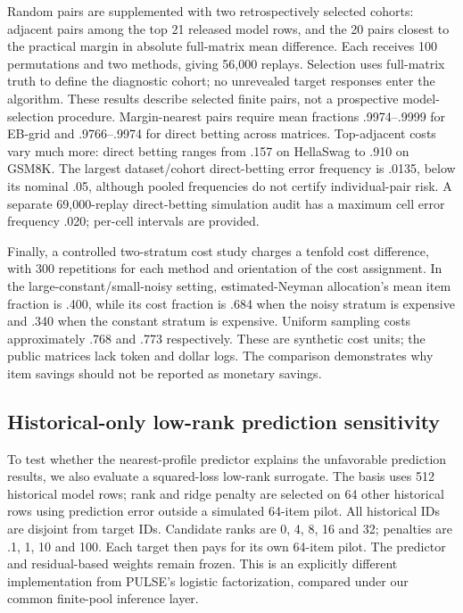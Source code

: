 Random pairs are supplemented with two retrospectively selected cohorts: adjacent pairs among the top 21 released model rows, and the 20 pairs closest to the practical margin in absolute full-matrix mean difference. Each receives 100 permutations and two methods, giving 56,000 replays. Selection uses full-matrix truth to define the diagnostic cohort; no unrevealed target responses enter the algorithm. These results describe selected finite pairs, not a prospective model-selection procedure. Margin-nearest pairs require mean fractions .9974--.9999 for EB-grid and .9766--.9974 for direct betting across matrices. Top-adjacent costs vary much more: direct betting ranges from .157 on HellaSwag to .910 on GSM8K. The largest dataset/cohort direct-betting error frequency is .0135, below its nominal .05, although pooled frequencies do not certify individual-pair risk. A separate 69,000-replay direct-betting simulation audit has a maximum cell error frequency .020; per-cell intervals are provided.

Finally, a controlled two-stratum cost study charges a tenfold cost difference, with 300 repetitions for each method and orientation of the cost assignment. In the large-constant/small-noisy setting, estimated-Neyman allocation's mean item fraction is .400, while its cost fraction is .684 when the noisy stratum is expensive and .340 when the constant stratum is expensive. Uniform sampling costs approximately .768 and .773 respectively. These are synthetic cost units; the public matrices lack token and dollar logs. The comparison demonstrates why item savings should not be reported as monetary savings.

\subsection{Historical-only low-rank prediction sensitivity}\label{historical-only-low-rank-prediction-sensitivity}

To test whether the nearest-profile predictor explains the unfavorable prediction results, we also evaluate a squared-loss low-rank surrogate. The basis uses 512 historical model rows; rank and ridge penalty are selected on 64 other historical rows using prediction error outside a simulated 64-item pilot. All historical IDs are disjoint from target IDs. Candidate ranks are 0, 4, 8, 16 and 32; penalties are .1, 1, 10 and 100. Each target then pays for its own 64-item pilot. The predictor and residual-based weights remain frozen. This is an explicitly different implementation from PULSE's logistic factorization, compared under our common finite-pool inference layer.

